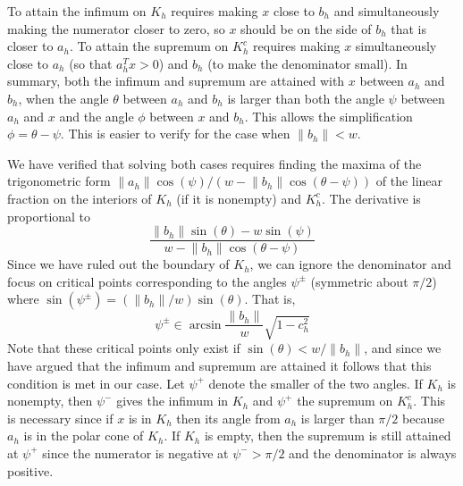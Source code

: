 \documentclass{imsart}
\newcommand{\norm}[1]{\lVert #1 \rVert}
\begin{document}
To attain the infimum on $K_h$ requires making $x$ close to $b_h$ and simultaneously making the numerator closer to zero, so $x$ should be on the side of $b_h$ that is closer to $a_h$. To attain the supremum on $K_h^c$ requires making $x$ simultaneously close to $a_h$ (so that $a_h^Tx > 0$) and $b_h$ (to make the denominator small). In summary, both the infimum and supremum are attained with $x$ between $a_h$ and $b_h$, when the angle $\theta$ between $a_h$ and $b_h$ is larger than both the angle $\psi$ between $a_h$ and $x$ and the angle $\phi$ between $x$ and $b_h$. This allows the simplification $\phi = \theta - \psi$. This is easier to verify for the case when $\norm{b_h} < w$.

We have verified that solving both cases requires finding the maxima of the trigonometric form $\norm{a_h} \cos (\psi) / (w - \norm{b_h} \cos(\theta - \psi))$ of the linear fraction on the interiors of $K_h$ (if it is nonempty) and $K_h^c$. The derivative is proportional to
\[
\frac{\norm{b_h} \sin(\theta) - w \sin(\psi)}{w - \norm{b_h} \cos(\theta - \psi)}
\]
Since we have ruled out the boundary of $K_h$, we can ignore the denominator and focus on critical points corresponding to the angles $\psi^{\pm}$ (symmetric about $\pi/2$) where $\sin(\psi^{\pm}) = (\norm{b_h} / w) \sin (\theta)$. That is,
\[
\psi^{\pm} \in \arcsin \frac{\norm{b_h}}{w} \sqrt{1-c_h^2}
\]
Note that these critical points only exist if $\sin(\theta) < w/\norm{b_h}$, and since we have argued that the infimum and supremum are attained it follows that this condition is met in our case. Let $\psi^+$ denote the smaller of the two angles. If $K_h$ is nonempty, then $\psi^-$ gives the infimum in $K_h$ and $\psi^+$ the supremum on $K_h^c$. This is necessary since if $x$ is in $K_h$ then its angle from $a_h$ is larger than $\pi/2$ because $a_h$ is in the polar cone of $K_h$. If $K_h$ is empty, then the supremum is still attained at $\psi^+$ since the numerator is negative at $\psi^- > \pi/2$ and the denominator is always positive.
\end{document}
